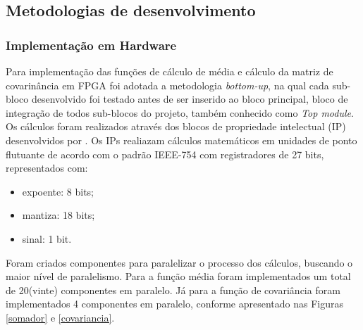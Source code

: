 \subsection{Metodologias de desenvolvimento}
\subsubsection{Implementação em Hardware}
Para implementação das funções de cálculo de média e cálculo da matriz de covarinância em FPGA foi adotada a metodologia \textit{bottom-up}, na qual cada sub-bloco desenvolvido foi testado antes de ser inserido ao bloco principal, bloco de integração de todos sub-blocos do projeto, também conhecido como \textit{Top module}.
Os cálculos foram realizados através dos blocos de propriedade intelectual (IP) desenvolvidos por \cite{munoz2010tradeoff}. Os IPs realiazam cálculos matemáticos em unidades de ponto flutuante de acordo com o padrão IEEE-754 com registradores de 27 bits, representados com:
\begin{itemize}
	\item expoente: 8 bits;
	\item mantiza: 18 bits;
	\item sinal: 1 bit.
\end{itemize}
Foram criados componentes para paralelizar o processo dos cálculos, buscando o maior nível de paralelismo.
Para a função média foram implementados um total de 20(vinte) componentes em paralelo. Já para a função de covariância foram implementados 4 componentes em paralelo, conforme apresentado nas Figuras \ref{somador} e \ref{covariancia}.

